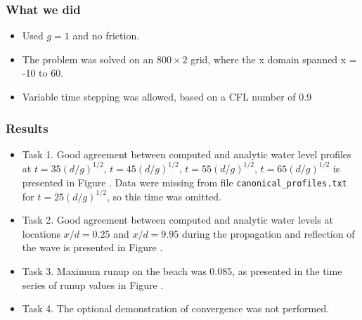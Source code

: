 \subsubsection{What we did}

\begin{itemize}
\item Used $g=1$ and no friction.
\item The problem was solved on an $800\times 2$ grid, where the x domain spanned x = -10 to 60.
\item Variable time stepping was allowed, based on a CFL number of 0.9
\end{itemize} 

\subsubsection{Results}
\begin{itemize}
\item Task 1. Good agreement between computed and analytic water level profiles at $t = 35(d/g)^{1/2}$, $t = 45(d/g)^{1/2}$, $t = 55(d/g)^{1/2}$, $t = 65(d/g)^{1/2}$ is presented in Figure .  Data were missing from file {\tt canonical\_profiles.txt} for $t=25(d/g)^{1/2}$, so this time was omitted.
\item Task 2. Good agreement between computed and analytic water levels at locations $x/d = 0.25$ and $x/d = 9.95$ during the propagation and reflection of the wave is presented in Figure .
\item Task 3. Maximum runup on the beach was 0.085, as presented in the time series of runup values in Figure .
\item Task 4. The optional demonstration of convergence was not performed.
\end{itemize}


